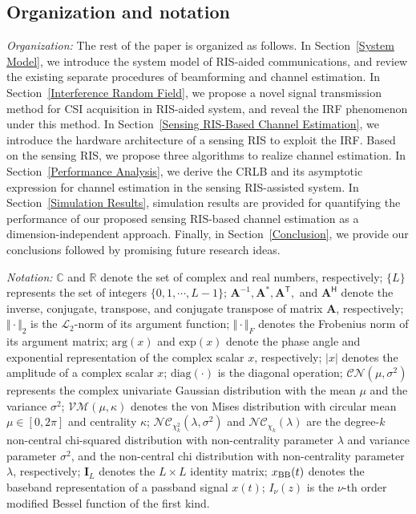 \documentclass[journal,twocolumn]{IEEEtran}
\theoremstyle{nonumberplain}
\def \T {\bm \Theta}
\def \VM {\mathcal{VM}}
\def \nc {\mathcal{NC}}
\def \T {^{\mathsf{T}}}
\def \H {^{\mathsf{H}}}
\begin{document}
\subsection{Organization and notation}

\textit{Organization:}
The rest of the paper is organized as follows.
In Section~\ref{System Model}, we introduce the system model of RIS-aided communications, and review the existing separate procedures of beamforming and channel estimation.
In Section~\ref{Interference Random Field}, we propose a novel signal transmission method for CSI acquisition in RIS-aided system, and reveal the \ac{IRF} phenomenon under this method.
In Section~\ref{Sensing RIS-Based Channel Estimation}, we introduce the hardware architecture of a sensing RIS to exploit the \ac{IRF}.
Based on the sensing RIS, we propose three algorithms to realize channel estimation.
In Section~\ref{Performance Analysis}, we derive the \ac{CRLB} and its asymptotic expression for channel estimation in the sensing RIS-assisted system.
In Section~\ref{Simulation Results}, simulation results are provided for quantifying the performance of our proposed sensing RIS-based channel estimation as a dimension-independent approach.
Finally, in Section~\ref{Conclusion}, we provide our conclusions followed by promising future research ideas.

\textit{Notation:} $\mathbb C$ and $\mathbb R$ denote the set of complex and real numbers, respectively;
$\{L\}$ represents the set of integers $\{0,1,\cdots,L-1\}$;
$\bm A^{-1}, \bm A^*,\bm A\T,$ and $\bm A\H$ denote the inverse, conjugate, transpose, and conjugate transpose of matrix $\bm A$, respectively; 
$\Vert \cdot\Vert_{2}$ is the $\mathcal{L}_{2}$-norm of its argument function;
$\Vert \cdot \Vert_{F}$ denotes the Frobenius norm of its argument matrix;  
$\text{arg}(x)$ and $\text{exp}(x)$ denote the phase angle and exponential representation of the complex scalar $x$, respectively;
$\vert x\vert$ denotes the amplitude
of a complex scalar $x$; 
$\text{diag}(\cdot )$ is the diagonal operation;
$\mathcal{CN}\left(\mu, \sigma^2 \right)$ represents the complex univariate Gaussian distribution with the mean $\mu$ and the variance $\sigma^2$;
$\VM(\mu, \kappa)$ denotes the von Mises distribution with circular mean $\mu\in [0,2\pi]$ and centrality $\kappa$;
$\nc_{\chi_k^2}(\lambda, \sigma^2)$ and $\nc_{\chi_k}(\lambda)$ are the degree-$k$ non-central chi-squared distribution with  non-centrality parameter $\lambda$ and variance parameter $\sigma^2$, and the non-central chi distribution with non-centrality parameter $\lambda$, respectively; 
$\bm I_{L}$ denotes the $L\times L$ identity matrix;
$x_{\rm BB}(t)$ denotes the baseband representation of a passband signal $x(t)$;
$I_\nu(z)$ is the $\nu$-th order modified Bessel function of the first kind. 
\end{document}
